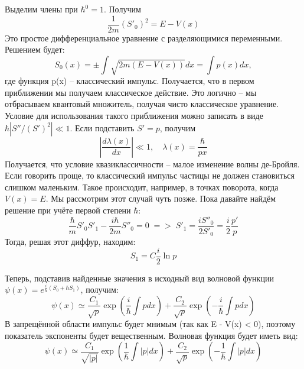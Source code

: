 Выделим члены при $\hbar^0 = 1$. Получим
\[
\frac{1}{2m}(S'_0)^2 = E - V(x)
\]
Это простое дифференциальное уравнение с разделяющимися переменными. Решением будет:
\[
S_0(x) = \pm \int\sqrt{2m\left( E - V(x) \right)}dx = \int p(x)dx,
\]
где функция p(x) -- классический импульс. Получается, что в первом приближении мы получаем классическое действие. Это логично -- мы отбрасываем квантовый множитель, получая чисто классическое уравнение. Условие для использования такого приближения можно записать в виде $\hbar|S''/(S')^2| \ll 1$. Если подставить $S' = p$, получим
\[
|\frac{d\lambda(x)}{dx}| \ll 1, \quad \lambda(x) = \frac{\hbar}{px}
\]
Получается, что условие квазиклассичности -- малое изменение волны де-Бройля. Если говорить проще, то классический импульс частицы не должен становиться слишком маленьким. Такое происходит, например, в точках поворота, когда $V(x) = E$. Мы рассмотрим этот случай чуть позже. Пока давайте найдём решение при учёте первой степени $\hbar$:
\[
\frac{\hbar}{m}S'_0 S'_1 - \frac{i\hbar}{2m}S''_0 = 0\; => \; S'_1 = \frac{iS''_0}{2S'_0} = \frac{i}{2}\frac{p'}{p}
\]
Тогда, решая этот диффур, находим:
\[
S_1 = C\frac{i}{2}\ln p
\]

Теперь, подставив найденные значения в исходный вид волновой функции $\psi(x) = e^{\frac{i}{\hbar}(S_0 + \hbar S_1)}$, получим:
\[
\psi(x) \simeq \frac{C_1}{\sqrt{p}}\exp\left(\frac{i}{\hbar}\int p dx \right) + \frac{C_2}{\sqrt{p}}\exp\left(-\frac{i}{\hbar}\int p dx \right)
\]
В запрещённой области импульс будет мнимым (так как E - V(x) < 0), поэтому показатель экспоненты будет вещественным. Волновая функция будет иметь вид:
\[
\psi(x) \simeq \frac{C_1}{\sqrt{|p|}}\exp\left(\frac{1}{\hbar}\int |p| dx \right) + \frac{C_2}{\sqrt{p}}\exp\left(-\frac{1}{\hbar}\int |p| dx \right)
\]


